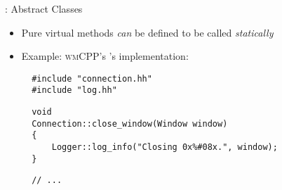 \begin{frame}[fragile]{\underline{\cpp}: Abstract Classes \hfill {\footnotesize \currentname}}


    \begin{itemize}

        \item Pure virtual methods \textit{can} be defined to be called \textit{statically}

        \item Example: \textsc{wmCPP}'s 's implementation:\\[3pt]
\begin{verbatim}
  #include "connection.hh"
  #include "log.hh"
\end{verbatim}
\begin{verbatim}
  void
  Connection::close_window(Window window)
  {
      Logger::log_info("Closing 0x%#08x.", window);
  }
\end{verbatim}
\begin{verbatim}
  // ...
\end{verbatim}

    \end{itemize}

    \vfill

\end{frame}

